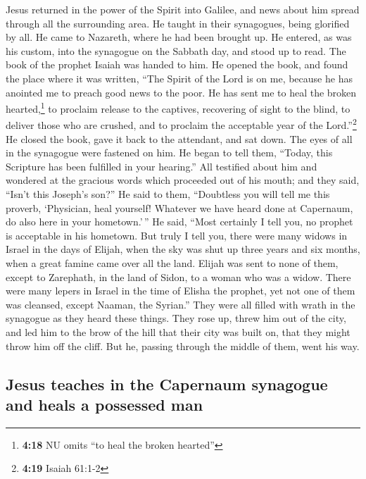  Jesus returned in the power of the Spirit into Galilee,
and news about him spread through all the surrounding area.
 He taught in their synagogues, being glorified by all.
 He came to Nazareth, where he had been brought up. He
entered, as was his custom, into the synagogue on the Sabbath day, and
stood up to read.  The book of the prophet Isaiah was
handed to him. He opened the book, and found the place where it was
written,  ``The Spirit of the Lord is on me, because he
has anointed me to preach good news to the poor. He has sent me to heal
the broken hearted,\footnote{\textbf{4:18} NU omits ``to heal the broken
  hearted''} to proclaim release to the captives, recovering of sight to
the blind, to deliver those who are crushed,  and to
proclaim the acceptable year of the Lord.''\footnote{\textbf{4:19}
  Isaiah 61:1-2}  He closed the book, gave it back to the
attendant, and sat down. The eyes of all in the synagogue were fastened
on him.  He began to tell them, ``Today, this Scripture
has been fulfilled in your hearing.''  All testified
about him and wondered at the gracious words which proceeded out of his
mouth; and they said, ``Isn't this Joseph's son?''  He
said to them, ``Doubtless you will tell me this proverb, `Physician,
heal yourself! Whatever we have heard done at Capernaum, do also here in
your hometown.'\,''  He said, ``Most certainly I tell
you, no prophet is acceptable in his hometown.  But truly
I tell you, there were many widows in Israel in the days of Elijah, when
the sky was shut up three years and six months, when a great famine came
over all the land.  Elijah was sent to none of them,
except to Zarephath, in the land of Sidon, to a woman who was a widow.
 There were many lepers in Israel in the time of Elisha
the prophet, yet not one of them was cleansed, except Naaman, the
Syrian.''  They were all filled with wrath in the
synagogue as they heard these things.  They rose up,
threw him out of the city, and led him to the brow of the hill that
their city was built on, that they might throw him off the cliff.
 But he, passing through the middle of them, went his
way.

\hypertarget{jesus-teaches-in-the-capernaum-synagogue-and-heals-a-possessed-man}{%
\subsection{Jesus teaches in the Capernaum synagogue and heals a
possessed
man}\label{jesus-teaches-in-the-capernaum-synagogue-and-heals-a-possessed-man}}

